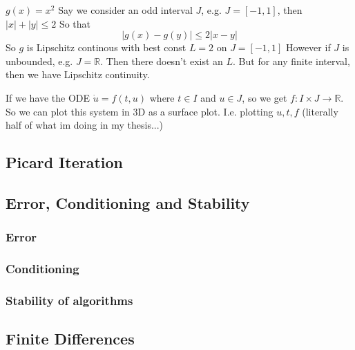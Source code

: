 \documentclass{/home/janmebows/Documents/LatexTemplates/myassignment}
\begin{document}
$g(x) = x^2$
Say we consider an odd interval $J$, e.g. $J=[-1,1]$, then $|x| + |y| \leq 2$
So that
\[|g(x)-g(y)| \leq 2 |x-y|\]
So $g$ is Lipschitz continous with best const $L=2$ on $J=[-1,1]$
However if $J$ is unbounded, e.g. $J =\mathbb{R}$. Then there doesn't exist an $L$.
But for any finite interval, then we have Lipschitz continuity.




If we have the ODE $\dot u = f(t,u)$ where $t \in I$ and $u \in J$, so we get $f:I\times J \to \mathbb{R}$. So we can plot this system in 3D as a surface plot. I.e. plotting $u,t,f$ (literally half of what im doing in my thesis...)











\subsection{Picard Iteration}



\subsection{Error, Conditioning and Stability}

\subsubsection{Error}

\subsubsection{Conditioning}

\subsubsection{Stability of algorithms}



\subsection{Finite Differences}
\end{document}
